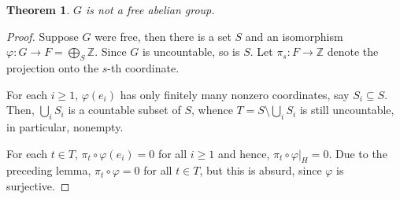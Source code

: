 \documentclass[12pt]{article}
\theoremstyle{thmstyle}
\newtheorem{theorem}{Theorem}
\theoremstyle{defstyle}
\newcommand{\Z}{\mathbb{Z}}
\renewcommand{\ge}{\geqslant}
\begin{document}
\begin{theorem}
    $G$ is not a free abelian group.
\end{theorem}
\begin{proof}
    Suppose $G$ were free, then there is a set $S$ and an isomorphism $\displaystyle\varphi: G\to F = \bigoplus_{S}\Z$. Since $G$ is uncountable, so is $S$. Let $\pi_s: F\to\Z$ denote the projection onto the $s$-th coordinate.

    For each $i\ge 1$, $\varphi(e_i)$ has only finitely many nonzero coordinates, say $S_i\subseteq S$. Then, $\bigcup_i S_i$ is a countable subset of $S$, whence $T = S\setminus\bigcup_{i} S_i$ is still uncountable, in particular, nonempty.

    For each $t\in T$, $\pi_t\circ\varphi(e_i) = 0$ for all $i\ge 1$ and hence, $\pi_t\circ\varphi|_H = 0$. Due to the preceding lemma, $\pi_t\circ\varphi = 0$ for all $t\in T$, but this is absurd, since $\varphi$ is surjective.
\end{proof}
\end{document}

